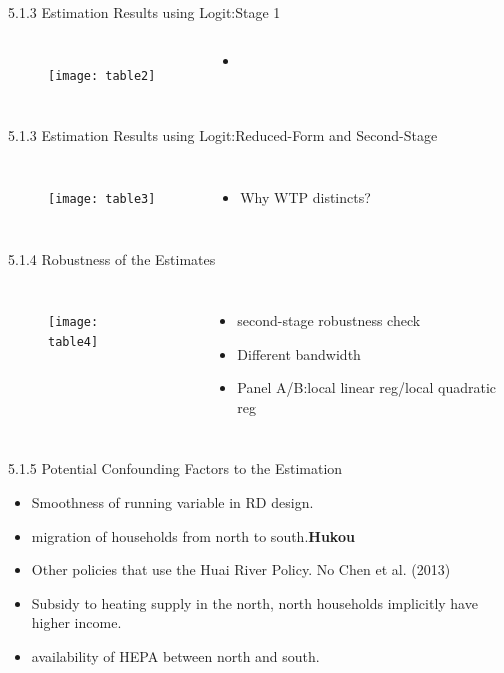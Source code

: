 \documentclass[10pt]{beamer}
\begin{document}
\begin{frame}{5.1.3 Estimation Results using Logit:Stage 1}
    \begin{columns}[c] 
    \column{9cm}
    \begin{figure}
        \centering
        \texttt{[image: table2]}
    \end{figure}
    \column{2cm}
    \begin{itemize}
        \item 
    \end{itemize}
	\end{columns}
\end{frame}

\begin{frame}{5.1.3 Estimation Results using Logit:Reduced-Form and Second-Stage}
    \begin{columns}[c] 
    \column{9cm}
    \begin{figure}
        \centering
        \texttt{[image: table3]}
    \end{figure}
    \column{4cm}
    \begin{itemize}
        \item Why WTP distincts?
    \end{itemize}
	\end{columns}
\end{frame}

\begin{frame}{5.1.4 Robustness of the Estimates}
    \begin{columns}[c] 
    \column{9cm}
    \begin{figure}
        \centering
        \texttt{[image: table4]}
    \end{figure}
    \column{4cm}
    \begin{itemize}
        \item second-stage robustness check
        \item Different bandwidth
        \item Panel A/B:local linear reg/local quadratic reg
    \end{itemize}
	\end{columns}
\end{frame}

\begin{frame}{5.1.5 Potential Confounding Factors to the Estimation}
	\textbf{}
	\begin{itemize}
	    \item Smoothness of running variable in RD design.
	    \item migration of households from north to south.\textbf{Hukou}
	    \item Other policies that use the Huai River Policy. No Chen et al. (2013)
	    \item Subsidy to heating supply in the north,   north households implicitly have higher income.
	    \item availability of HEPA between north and south.
	\end{itemize}
\end{frame}
\end{document}
